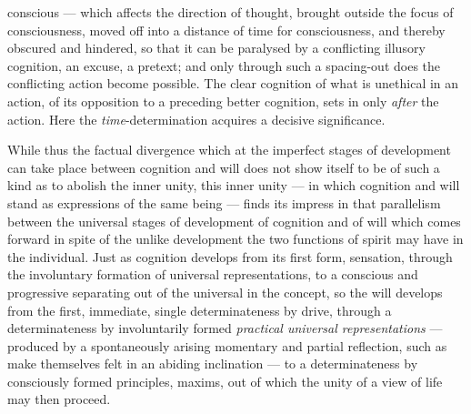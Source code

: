 \documentclass[12pt,a4paper]{book}
\begin{document}
conscious --- which affects the direction of thought, brought outside the focus
of consciousness, moved off into a distance of time for consciousness, and
thereby obscured and hindered, so that it can be paralysed by a conflicting
illusory cognition, an excuse, a pretext; and only through such a spacing-out
does the conflicting action become possible. The clear cognition of what is
unethical in an action, of its opposition to a preceding better cognition,
sets in only \emph{after} the action. Here the \emph{time}-determination
acquires a decisive significance.

While thus the factual divergence which at the imperfect stages of development
can take place between cognition and will does not show itself to be of such a
kind as to abolish the inner unity, this inner unity --- in which cognition
and will stand as expressions of the same being --- finds its impress in that
parallelism between the universal stages of development of cognition and of
will which comes forward in spite of the unlike development the two functions
of spirit may have in the individual. Just as cognition develops from its
first form, sensation, through the involuntary formation of universal
representations, to a conscious and progressive separating out of the
universal in the concept, so the will develops from the first, immediate,
single determinateness by drive,
\setcounter{footnote}{0}%
through a determinateness by involuntarily formed \emph{practical universal
representations} --- produced by a spontaneously arising momentary and partial
reflection, such as make themselves felt in an abiding inclination --- to a
determinateness by consciously formed principles, maxims, out of which the
unity of a view of life may then proceed.
\end{document}
